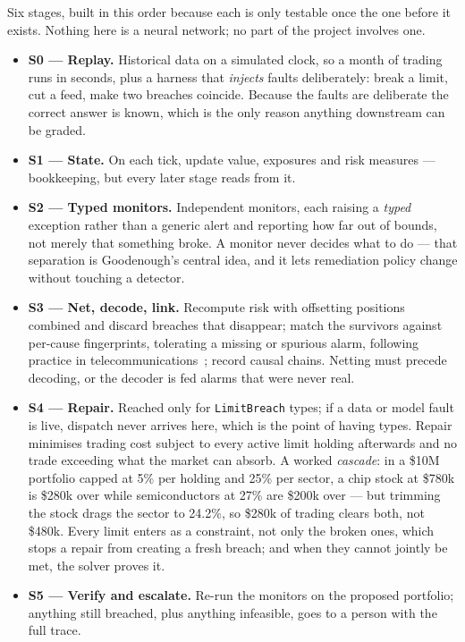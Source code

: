 \documentclass[11pt]{article}
\begin{document}
Six stages, built in this order because each is only testable once the one before it
exists. Nothing here is a neural network; no part of the project involves one.

\begin{itemize}[leftmargin=*]
\item \textbf{S0 --- Replay.} Historical data on a simulated clock, so a month of trading runs
  in seconds, plus a harness that \emph{injects} faults deliberately: break a limit, cut a
  feed, make two breaches coincide. Because the faults are deliberate the correct answer is
  known, which is the only reason anything downstream can be graded.
\item \textbf{S1 --- State.} On each tick, update value, exposures and risk measures ---
  bookkeeping, but every later stage reads from it.
\item \textbf{S2 --- Typed monitors.} Independent monitors, each raising a \emph{typed}
  exception rather than a generic alert and reporting how far out of bounds, not merely that
  something broke. A monitor never decides what to do --- that separation is Goodenough's
  central idea, and it lets remediation policy change without touching a detector.
\item \textbf{S3 --- Net, decode, link.} Recompute risk with offsetting positions combined and
  discard breaches that disappear; match the survivors against per-cause fingerprints,
  tolerating a missing or spurious alarm, following practice in
  telecommunications~\cite{jakobson1993}; record causal chains. Netting must precede decoding,
  or the decoder is fed alarms that were never real.
\item \textbf{S4 --- Repair.} Reached only for \texttt{LimitBreach} types; if a data or
  model fault is live, dispatch never arrives here, which is the point of having types.
  Repair minimises trading cost subject to every active limit holding afterwards and no trade
  exceeding what the market can absorb. A worked \emph{cascade}: in a \$10M portfolio capped
  at 5\% per holding and 25\% per sector, a chip stock at \$780k is \$280k over while
  semiconductors at 27\% are \$200k over --- but trimming the stock drags the sector to
  24.2\%, so \$280k of trading clears both, not \$480k. Every limit enters as a constraint,
  not only the broken ones, which stops a repair from creating a fresh breach; and when they
  cannot jointly be met, the solver proves it.
\item \textbf{S5 --- Verify and escalate.} Re-run the monitors on the proposed portfolio;
  anything still breached, plus anything infeasible, goes to a person with the full trace.
\end{itemize}
\end{document}
